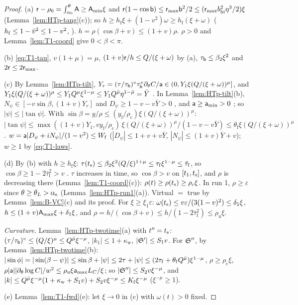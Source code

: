 \begin{proof}
(a) $\mathsf r-\rho_0=\int_{\alpha_0}^\theta\mathsf A\ge\mathsf A_{\min}\xi$ and $\mathsf r(1-\cos\mathsf b)\le\mathsf r_{\max}\mathsf b^2/2\le(\mathsf r_{\max}b_{\mathrm{hi}}^2\eta^3/2)\xi$
(Lemma~\ref{lem:HTp-tang}(c)); so $h\ge h_{\mathrm f}\xi+(1-v^2)\omega\ge h_{\mathrm f}(\xi+\omega)$ ($h_{\mathrm f}\le1-\bar v^2\le1-v^2$,
). $h=\rho(\cos\beta+v)\le(1+v)\rho$. $\rho>0$ and Lemma~\ref{lem:T1-coord} give $0<\beta<\pi$.

(b) \eqref{eq:T1-tau}, $v(1+\mu)=\mu$, $(1+v)\mathsf r/h\le Q/(\xi+\omega)$ by (a), $\tau_{\mathsf b}\le\beta_2\xi^2$ and $2\mathsf r\le2\mathsf r_{\max}$.

(c) By Lemma~\ref{lem:HTp-tilt}, $Y_r=(\tau/\tau_{\mathsf b})^v\tau_{\mathsf b}^v\partial_\theta C/\mathsf a\in(0,Y_1\xi(Q/(\xi+\omega))^\mu]$, and
$Y_1\xi(Q/(\xi+\omega))^\mu\le Y_1Q^\mu\xi^{1-\mu}\le Y_1Q^{\bar\mu}\eta^{1-\bar\mu}=\bar Y$ . In Lemma~\ref{lem:HTp-tilt}(b),
$N_\psi\in[-v\sin\beta,(1+v)Y_r]$ and $D_\psi\ge1-v-v\bar Y>0$ , and $\mathsf a\ge\mathsf a_{\min}>0$ ; so $|\psi|\le|\tan\psi|$.
With $\sin\beta=y/\rho\le(y_{\mathrm f}/\rho_{\mathrm c})\xi(Q/(\xi+\omega))^\mu$:
$|\tan\psi|\le\max((1+v)Y_1,vy_{\mathrm f}/\rho_{\mathrm c})\,\xi(Q/(\xi+\omega))^\mu/(1-v-v\bar Y)\le\theta_{\mathrm f}\xi(Q/(\xi+\omega))^\mu$.
$w=\mathsf a|D_\psi+iN_\psi|/(1-v^2)\le W_{\mathrm f}$ ($|D_\psi|\le1+v+v\bar Y$, $|N_\psi|\le(1+v)\bar Y+v$); $w\ge1$ by \eqref{eq:T1-laws}.

(d) By (b) with $h\ge h_{\mathrm f}\xi$: $\tau(t_{\mathrm s})\le\beta_2\xi^2(Q/\xi)^{1+\mu}\le\tau_{\mathrm f}\xi^{1-\mu}\le\bar\tau_{\mathrm f}$, so
$\cos\beta\ge1-2\bar\tau_{\mathrm f}^2>v$ . $\tau$ increases in time, so $\cos\beta>v$ on $[t_1,t_{\mathrm s}]$, and $\rho$ is decreasing
there (Lemma~\ref{lem:T1-coord}(c)): $\rho(t)\ge\rho(t_{\mathrm s})\ge\rho_{\mathrm c}\xi$. In run 1, $\rho\ge\varepsilon$ since
$\theta\ge\theta_L>\alpha_{\mathrm s}$ (Lemma~\ref{lem:HTp-run1}(a)). Virtual $=$ true by Lemma~\ref{lem:B-VC}(c) and its proof. For
$\xi\ge\xi_1\varepsilon$: $\omega(t_{\mathrm s})\le v\varepsilon/(3(1-v)^2)\le\delta_1\xi$, $h\le(1+v)\mathsf A_{\max}\xi+\delta_1\xi$, and
$\rho=h/(\cos\beta+v)\le h/(1-2\bar\tau_{\mathrm f}^2)\le\rho_{\mathrm u}\xi$.

\emph{Curvature.} Lemma~\ref{lem:HTp-twotime}(a) with $t''=t_{\mathrm s}$: $(\tau/\tau_{\mathsf b})^v\le(Q/\xi)^\mu\le Q^{\bar\mu}\xi^{-\mu}$,
$|k_1|\le1+\kappa_{\mathrm w}$, $|\mathfrak S'|\le S_1v$. For $\mathfrak S''$, by Lemma~\ref{lem:HTp-twotime}(b):
$|\sin\phi|=|\sin(\beta-\psi)|\le\sin\beta+|\psi|\le2\tau+|\psi|\le(2\tau_{\mathrm f}+\theta_{\mathrm f}Q^{\bar\mu})\xi^{1-\mu}$, $\rho\ge\rho_{\mathrm c}\xi$,
$\rho|\mathsf a||\partial_\theta\log C|/w^2\le\rho_{\mathrm u}\xi\mathsf a_{\max}L_C/\xi$; so $|\mathfrak S''|\le S_2v\xi^{-\mu}$, and
$|k|\le Q^{\bar\mu}\xi^{-\mu}(1+\kappa_{\mathrm w}+S_1v)+S_2v\xi^{-\mu}\le K_{\mathrm f}\xi^{-\mu}$ ($\xi^{-\mu}\ge1$).

(e) Lemma~\ref{lem:T1-fwd}(e): let $\xi\to0$ in (c) with $\omega(t)>0$ fixed.
\end{proof}

